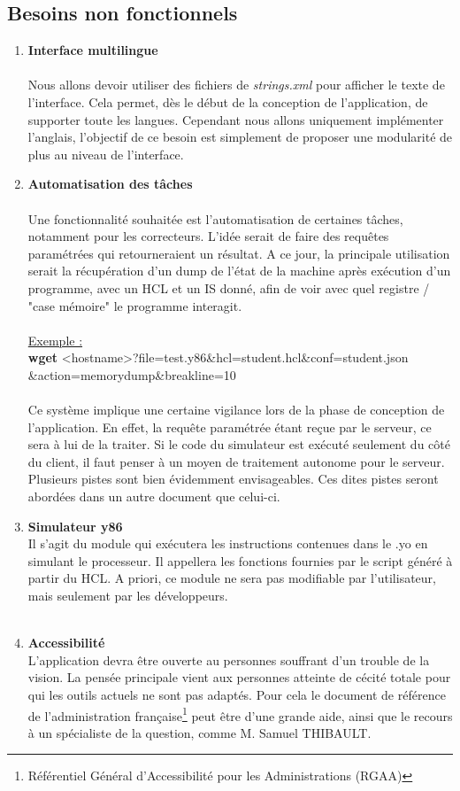 \documentclass[french]{article}
\newcommand{\itembf}[1]{\item \textbf{#1}\\}
\begin{document}
\subsection{Besoins non fonctionnels}
\begin{enumerate}
    \itembf{Interface multilingue}\\
    Nous allons devoir utiliser des fichiers de \textit{strings.xml} pour afficher le texte de l'interface. Cela permet, dès le début de la conception de l'application, de supporter toute les langues. Cependant nous allons uniquement implémenter l'anglais, l'objectif de ce besoin est simplement de proposer une modularité de plus au niveau de l'interface.
    \\
    \itembf{Automatisation des tâches}\label{Besoin nf Automatisation des tâches}\\
    Une fonctionnalité souhaitée est l'automatisation de certaines tâches, notamment pour les correcteurs. L'idée serait de faire des requêtes paramétrées qui retourneraient un résultat. A ce jour, la principale utilisation serait la récupération d'un dump de l'état de la machine après exécution d'un programme, avec un HCL et un IS donné, afin de voir avec quel registre / "case mémoire" le programme interagit.
    \\\\
    \underline{Exemple :}\\ \textbf{wget} <hostname>?file=test.y86\&hcl=student.hcl\&conf=student.json\\\&action=memorydump\&breakline=10
    \\\\
    Ce système implique une certaine vigilance lors de la phase de conception de l'application. En effet, la requête paramétrée étant reçue par le serveur, ce sera à lui de la traiter. Si le code du simulateur est exécuté seulement du côté du client, il faut penser à un moyen de traitement autonome pour le serveur. Plusieurs pistes sont bien évidemment envisageables. Ces dites pistes seront abordées dans un autre document que celui-ci.
    \\
    \itembf{Simulateur y86}
    Il s'agit du module qui exécutera les instructions contenues dans le .yo en simulant le processeur. Il appellera les fonctions fournies par le script généré à partir du HCL. A priori, ce module ne sera pas modifiable par l'utilisateur, mais seulement par les développeurs. \\
    \\
    \itembf{Accessibilité}
    L’application devra être ouverte au personnes souffrant d’un trouble de la vision. La pensée principale vient aux personnes atteinte de cécité totale pour qui les outils actuels ne sont pas adaptés. Pour cela le document de référence de l’administration française\footnote{Référentiel Général d'Accessibilité pour les Administrations (RGAA)} peut être d’une grande aide, ainsi que le recours à un spécialiste de la question, comme M. Samuel THIBAULT.

\end{enumerate}
\end{document}
